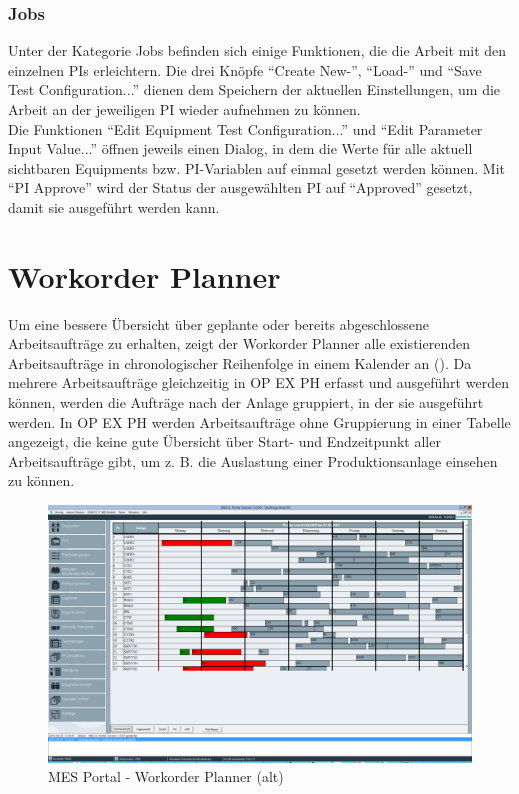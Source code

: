 \subsubsection{Jobs}
Unter der Kategorie Jobs befinden sich einige Funktionen, die die Arbeit mit den einzelnen \glspl{PI} erleichtern. Die drei Knöpfe \enquote{Create New-}, \enquote{Load-} und \enquote{Save Test Configuration...} dienen dem Speichern der aktuellen Einstellungen, um die Arbeit an der jeweiligen \gls{PI} wieder aufnehmen zu können.\\
Die Funktionen \enquote{Edit Equipment Test Configuration...} und \enquote{Edit Parameter Input Value...} öffnen jeweils einen Dialog, in dem die Werte für alle aktuell sichtbaren Equipments bzw. \gls{PI}-Variablen auf einmal gesetzt werden können. Mit \enquote{PI Approve} wird der Status der ausgewählten \gls{PI} auf \enquote{Approved} gesetzt, damit sie ausgeführt werden kann.

\newpage\section{Workorder Planner}
Um eine bessere Übersicht über geplante oder bereits abgeschlossene Arbeitsaufträge zu erhalten, zeigt der Workorder Planner alle existierenden Arbeitsaufträge in chronologischer Reihenfolge in einem Kalender an (). Da mehrere Arbeitsaufträge gleichzeitig in \gls{OP EX PH} erfasst und ausgeführt werden können, werden die Aufträge nach der Anlage gruppiert, in der sie ausgeführt werden. In \gls{OP EX PH} werden Arbeitsaufträge ohne Gruppierung in einer Tabelle angezeigt, die keine gute Übersicht über Start- und Endzeitpunkt aller Arbeitsaufträge gibt, um z. B. die Auslastung einer Produktionsanlage einsehen zu können.
\begin{figure}[htbp]
  \centering
  \includegraphics[width=\textwidth]{img/mes-portal_workorder-planner}
  \caption{\label{fig-mes_portal_workorder-planner}MES Portal - Workorder Planner (alt)}
\end{figure}

